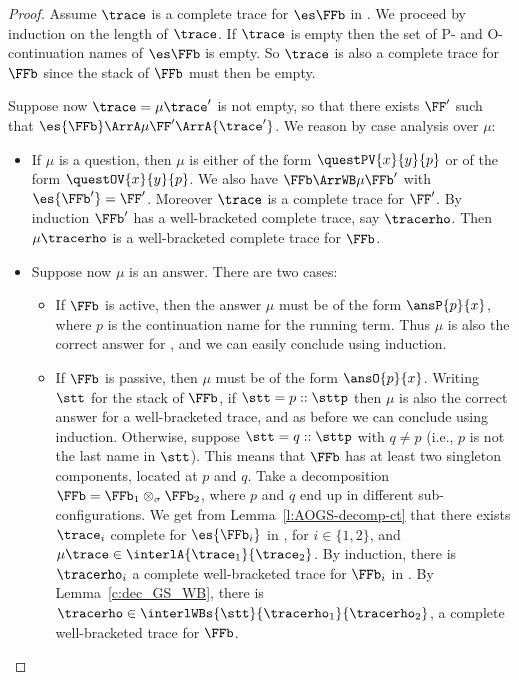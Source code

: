 \begin{proof}
Assume $\trace$ is a complete trace for $\es\FFb$ in \AOGS.
We proceed by induction on the length of $\trace$. 
If $\trace$ is empty then the set of P- and O- continuation names of
$\es\FFb$ is empty.
So $\trace$ is also a complete trace for $\FFb$
since the stack of $\FFb$ must then be empty.

Suppose now $\trace = \mu \trace'$ is not empty,
so that there exists $\FF'$
such that $\es{\FFb} \ArrA \mu \FF' \ArrA{\trace'}$.
We reason by case analysis over $\mu$:
\begin{itemize}
\item If $\mu$ is a question,  then $\mu$ is either 
of the form $\questPV{x}{y}{p}$ 
or of the form $ \questOV{x}{y}{p}$.
We also have $\FFb  \ArrWB \mu \FFb'$
with 
$\es{\FFb'}= \FF'$.
Moreover $\trace $ is a complete trace %
for $\FF'$. 
By induction $\FFb'$ 
has a well-bracketed complete trace, %
say $\tracerho$.
Then $\mu \tracerho$ is a well-bracketed complete trace %
for $\FFb$. 
\item Suppose now $\mu$ is an answer. There are two cases:
\begin{itemize}
\item If $\FFb$ is active, then the answer $\mu$ must be of the form 
$\ansP{p}{x}$, where $p$ is the continuation name for the running term.
Thus $\mu$ is also the correct answer for \WBOGS, and we can easily conclude using
induction. 
\item If $\FFb$ is passive, then 
 $\mu$ must be of the form 
 $\ansO{p}{x}$. Writing $\stt$ for the stack of $\FFb$,
 if $\stt = p::\sttp$ then $\mu$ is also    
 the correct answer for a well-bracketed trace, and as before  we can conclude using
 induction.  Otherwise, suppose 
 $\stt = q::\sttp$ with $q\neq p$
 (i.e., $p$ is not the last  name in $\stt$).
 This means that $\FFb$ has at least two
 singleton components, located at $p$ and $q$. 
 Take a decomposition
 $\FFb = \FFb_1 \otimes_{\sigma} \FFb_2 $,    
 where $p$ and $q$ end up in different sub-configurations. 
 We get from Lemma~\ref{l:AOGS-decomp-ct}
 that there exists $\trace_i$ complete for $\es{\FFb_i}$ in \AOGS, 
 for $i\in \{1,2\}$, and 
 $\mu \trace \in \interlA{\trace_1}{\trace_2}$.
 By induction, there is $ \tracerho_i $ a complete well-bracketed trace 
 for $\FFb_i$ in \WBOGS.
%
 By Lemma~\ref{c:dec_GS_WB}, 
 there is $\tracerho \in \interlWBs{\stt}{\tracerho_1}{\tracerho_2}$, 
 a complete well-bracketed trace for $\FFb$.
\qedhere
\end{itemize}
\end{itemize}
\end{proof} 

